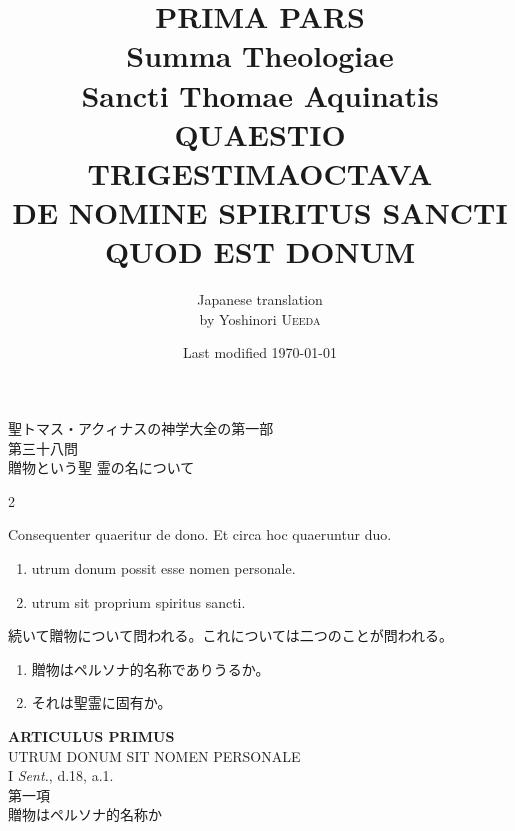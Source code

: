 \documentclass[paper=a4paper,fontsize=10pt,jafontsize=9pt,titlepage]{jlreq}
\title{{\bfseries PRIMA PARS}\\{\Huge Summa Theologiae}\\Sancti Thomae
    Aquinatis\\{\sffamily QUAESTIO TRIGESTIMAOCTAVA}\\DE NOMINE SPIRITUS
SANCTI QUOD EST DONUM}
\author{Japanese translation\\by Yoshinori {\scshape Ueeda}}
\date{Last modified \today}
\begin{document}
\maketitle
\begin{center}
    {\Large 聖トマス・アクィナスの神学大全の第一部\\第三十八問\\贈物という聖
    霊の名について}
\end{center}

\thispagestyle{empty}
\begin{paracol}{2}

Consequenter quaeritur de dono. Et circa hoc quaeruntur duo. 

    \begin{enumerate}
        \item utrum donum possit esse nomen personale.
        \item utrum sit proprium spiritus sancti.
    \end{enumerate}

\switchcolumn

続いて贈物について問われる。これについては二つのことが問われる。
\begin{enumerate}
    \item 贈物はペルソナ的名称でありうるか。
    \item それは聖霊に固有か。
\end{enumerate}

\end{paracol}

\newpage

\begin{center}
    {\Large {\bfseries ARTICULUS PRIMUS}}\\
    {\large UTRUM DONUM SIT NOMEN PERSONALE}\\
    {\footnotesize I \textit{Sent.}, d.18, a.1.}\\
    {\Large 第一項\\贈物はペルソナ的名称か}
\end{center}


{}
\setcounter{section}{1}
\setcounter{subsection}{0}
\end{document}
